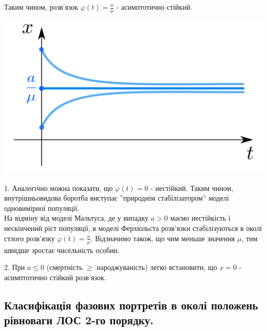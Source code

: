 Таким чином, розв'язок $\varphi(t) = \frac{a}{\mu}$ - асимптотично стійкий.
\begin{center} \includegraphics[scale=0.3]{assets/lectures_recent-0b98e3f0.png} \end{center}
\begin{remark}
    1. Аналогічно можна показати, що $\varphi (t) = 0$ - нестійкий. Таким чином, внутрішньовидова боротба виступає ''природнім стабілізатором'' моделі одновимірної популяції. \\
    На відміну від моделі Мальтуса, де у випадку $ a > 0$ маємо нестійкість і нескінчений ріст популяції, в моделі Ферхюльста розв'язки стабілізуються в околі стлого розв'язку $\varphi(t) = \frac{a}{\mu}.$ Відзначимо також, що чим меньше значення $\mu$, тим швидше зростає чисельність особин.
\end{remark}

\begin{remark}
    2. При $ a\leq 0$ (смертність $\geq$  народжуваність) легко встановити, що $ x=0 $ - асимптотично стійкий розв'язок.
\end{remark}

\subsection{Класифікація фазових портретів в околі положень рівноваги ЛОС 2-го порядку.}

